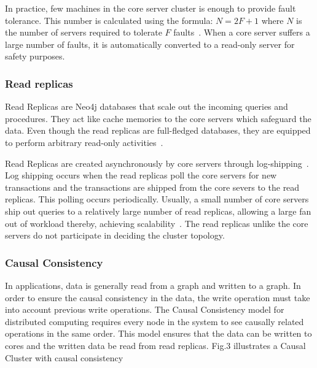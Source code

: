 \documentclass[9pt,twocolumn,twoside]{../../styles/osajnl}
\begin{document}
In practice, few machines in the core server cluster is enough to provide fault tolerance. This number is calculated using the formula: $N = 2F +1 $ where $N$ is the number of servers required to tolerate $F$ faults~\cite{www-neo4j-causal}. When a core server suffers a large number of faults, it is automatically converted to a read-only server for safety purposes. 

\subsubsection{Read replicas}
Read Replicas are Neo4j databases that scale out the incoming queries and procedures. They act like cache memories to the core servers which safeguard the data. Even though the read replicas are full-fledged databases, they are equipped to perform arbitrary read-only activities~\cite{www-neo4j-causal}.

Read Replicas are created asynchronously by core servers through log-shipping~\cite{www-neo4j-causal}. Log shipping occurs when the read replicas poll the core servers for new transactions and the transactions are shipped from the core severs to the read replicas. This polling occurs periodically. Usually, a small number of core servers ship out queries to a relatively large number of read replicas, allowing a large fan out of workload thereby, achieving scalability~\cite{www-neo4j-causal}. The read replicas unlike the core servers do not participate in deciding the cluster topology. 

\subsubsection{Causal Consistency}
In applications, data is generally read from a graph and written to a graph. In order to ensure the causal consistency in the data, the write operation must take into account previous write operations. The Causal Consistency model for distributed computing requires every node in the system to see causally related operations in the same order. This model ensures that the data can be written to cores and the written data be read from read replicas.
Fig.3 illustrates a Causal Cluster with causal consistency
\end{document}

